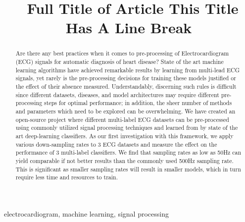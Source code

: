 \documentclass[pmlr,twocolumn]{jmlr}%
\title[ECG Scaling]{~Full Title of Article \titlebreak This Title Has
A Line Break}
\author{\Name{Amir Salimi} \Email{{asalimi@ualberta.ca}\\
\Name{Abram Hindle} \Email{abram.hindle@ualberta.ca}\\
\Name{Osmar Zaiane} \Email{zaiane@ualberta.ca}\\
\addr University of Alberta}}
\begin{document}
\maketitle

\begin{abstract}
Are there any best practices when it comes to pre-processing of Electrocardiogram (ECG) signals for automatic diagnosis of heart disease? 
State of the art machine learning algorithms have achieved remarkable results by learning from multi-lead ECG signals, yet rarely is the pre-processing decisions for training these models justified or the effect of their absence measured. Understandably, discerning such rules is difficult since different datasets, diseases, and model architectures may require different pre-processing steps for optimal performance; in addition, the sheer number of methods and parameters which need to be explored can be overwhelming. We have created an open-source project where different multi-label ECG datasets can be pre-processed using commonly utilized signal processing techniques and learned from by state of the art deep-learning classifiers. As our first investigation with this framework, we apply various down-sampling rates to 3 ECG datasets and measure the effect on the performance of 3 multi-label classifiers. We find that sampling rates as low as 50Hz can yield comparable if not better results than the commonly used 500Hz sampling rate. This is significant as smaller sampling rates will result in smaller models, which in turn require less time and resources to train. 

\end{abstract}
\begin{keywords}
electrocardiogram, machine learning, signal processing
\end{keywords}
\end{document}
